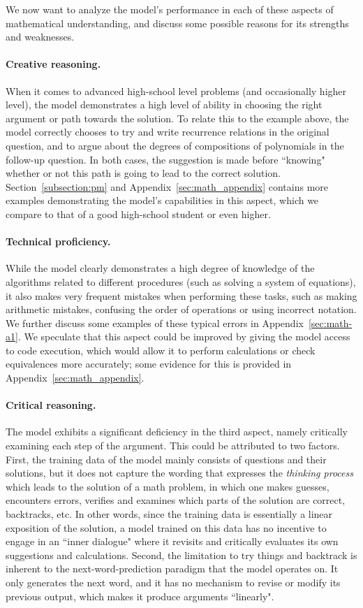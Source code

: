 We now want to analyze the model's performance in each of these aspects of mathematical understanding, and discuss some possible reasons for its strengths and weaknesses.

\paragraph{Creative reasoning.} When it comes to advanced high-school level problems (and occasionally higher level), the model demonstrates a high level of ability in choosing the right argument or path towards the solution. To relate this to the example above, the model correctly chooses to try and write recurrence relations in the original question, and to argue about the degrees of compositions of polynomials in the follow-up question. In both cases, the suggestion is made before ``knowing" whether or not this path is going to lead to the correct solution. Section~\ref{subsection:pm} and Appendix~\ref{sec:math_appendix} contains more examples demonstrating the model's capabilities in this aspect, which we compare to that of a good high-school student or even higher.

\paragraph{Technical proficiency.} While the model clearly demonstrates a high degree of knowledge of the algorithms related to different procedures (such as solving a system of equations), it also makes very frequent mistakes when performing these tasks, such as making arithmetic mistakes, confusing the order of operations or using incorrect notation. We further discuss some examples of these typical errors in Appendix~\ref{sec:math-a1}. We speculate that this aspect could be improved by giving the model access to code execution, which would allow it to perform calculations or check equivalences more accurately; some evidence for this is provided in Appendix~\ref{sec:math_appendix}.

\paragraph{Critical reasoning.} The model exhibits a significant deficiency in the third aspect, namely critically examining each step of the argument. This could be attributed to two factors. First, the training data of the model mainly consists of questions and their solutions, but it does not capture the wording that expresses the \emph{thinking process} which leads to the solution of a math problem, in which one makes guesses, encounters errors, verifies and examines which parts of the solution are correct, backtracks, etc. In other words, since the training data is essentially a linear exposition of the solution, a model trained on this data has no incentive to engage in an ``inner dialogue" where it revisits and critically evaluates its own suggestions and calculations. Second, the limitation to try things and backtrack is inherent to the next-word-prediction paradigm that the model operates on. It only generates the next word, and it has no mechanism to revise or modify its previous output, which makes it produce arguments ``linearly". \\

